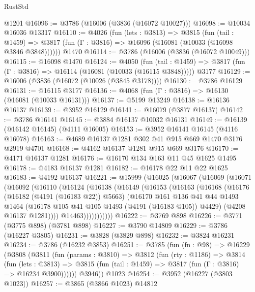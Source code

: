\begin{lexlean}{RustStd}
\begin{coremodule}
    @1201
@16096 := @3786 (@16006 (@3836 (@16072 @10027)))
@16098 := @10034 @16036 @13317
@16110 := @4026
    (fun (lets : @3813) =>
    @3815
      (fun (tail : @1459) =>
      @3817 (fun (Γ : @3816) => @16096 (@16081 (@10033 (@16098 @3846 @3848))))))
    @1470
@16114 := @3786 (@16006 (@3836 (@16072 @10049)))
@16115 := @16098 @1470
@16124 := @4050
    (fun (tail : @1459) => @3817 (fun (Γ : @3816) => @16114 (@16081 (@10033 (@16115 @3848)))))
    @3177
@16129 := @16006 (@3836 (@16072 (@10026 (@3845 @3178))))
@16130 := @3786 @16129
@16131 := @16115 @3177
@16136 := @4068 (fun (Γ : @3816) => @16130 (@16081 (@10033 @16131)))
@16137 := @5199 @13249
@16138 := @16136 @16137
@16139 := @3952 @16129
@16141 := @16079 (@3877 @16137)
@16142 := @3786 @16141
@16145 := @3884 @16137 @10032 @16131
@16149 := @16139 (@16142 @16145) (@4111 @16005)
@16153 := @3952 @16141 @16145 (@4116 @16078)
@16163 := @4689 @16137 @1281 @302 @41 @915 @669 @1470 @3176 @2919 @4701
@16168 := @4162 @16137 @1281 @915 @669 @3176
@16170 := @4171 @16137 @1281
@16176 := @16170 @134 @163 @11 @45 @1625 @1495
@16178 := @4183 @16137 @1281
@16182 := @16178 @22 @11 @22 @1625
@16183 := @4192 @16137
@16221 := @15999
    (@16025
      (@16067
        (@16069
          (@16071
            (@16092
              (@16110
                (@16124
                  (@16138
                    (@16149
                      (@16153
                        (@16163
                          (@16168
                            (@16176
                              (@16182 (@4191 (@16183 @22)) @5663)
                              (@16170
                                @161
                                @136
                                @41
                                @44
                                @1493
                                @1464
                                (@16178 @105 @41 @105 @1493 (@4191 (@16183 @105)) @4429)
                                (@4208 @16137 @1281))))
                          @14463)))))))))))
@16222 := @3769 @898
@16226 := @3771 (@3775 @898) (@3781 @898)
@16227 := @3790 @14809
@16229 := @3786 (@16227 @3805)
@16231 := @3828 (@3829 @898)
@16232 := @3824 @16231
@16234 := @3786 (@16232 @3853)
@16251 := @3785
    (fun (fn : @98) =>
    @16229
      (@3808
        (@3811
          (fun (params : @3810) =>
          @3812
            (fun (rty : @1186) =>
            @3814
              (fun (lets : @3813) =>
              @3815 (fun (tail : @1459) => @3817 (fun (Γ : @3816) => @16234 @3900))))))
        @3946))
    @1023
@16254 := @3952 (@16227 (@3803 @1023))
@16257 := @3865 (@3866 @1023) @14812

\end{coremodule}
\end{lexlean}
